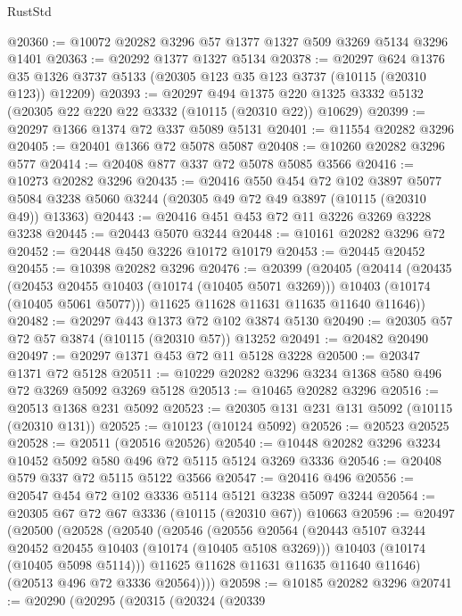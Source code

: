 \begin{lexlean}{RustStd}
\begin{coremodule}
@20360 := @10072 @20282 @3296 @57 @1377 @1327 @509 @3269 @5134 @3296 @1401
@20363 := @20292 @1377 @1327 @5134
@20378 := @20297
    @624
    @1376
    @35
    @1326
    @3737
    @5133
    (@20305 @123 @35 @123 @3737 (@10115 (@20310 @123)) @12209)
@20393 := @20297
    @494
    @1375
    @220
    @1325
    @3332
    @5132
    (@20305 @22 @220 @22 @3332 (@10115 (@20310 @22)) @10629)
@20399 := @20297 @1366 @1374 @72 @337 @5089 @5131
@20401 := @11554 @20282 @3296
@20405 := @20401 @1366 @72 @5078 @5087
@20408 := @10260 @20282 @3296 @577
@20414 := @20408 @877 @337 @72 @5078 @5085 @3566
@20416 := @10273 @20282 @3296
@20435 := @20416
    @550
    @454
    @72
    @102
    @3897
    @5077
    @5084
    @3238
    @5060
    @3244
    (@20305 @49 @72 @49 @3897 (@10115 (@20310 @49)) @13363)
@20443 := @20416 @451 @453 @72 @11 @3226 @3269 @3228 @3238
@20445 := @20443 @5070 @3244
@20448 := @10161 @20282 @3296 @72
@20452 := @20448 @450 @3226 @10172 @10179
@20453 := @20445 @20452
@20455 := @10398 @20282 @3296
@20476 := @20399
    (@20405
      (@20414
        (@20435
          (@20453 @20455 @10403 (@10174 (@10405 @5071 @3269)))
          @10403
          (@10174 (@10405 @5061 @5077)))
        @11625
        @11628
        @11631
        @11635
        @11640
        @11646))
@20482 := @20297 @443 @1373 @72 @102 @3874 @5130
@20490 := @20305 @57 @72 @57 @3874 (@10115 (@20310 @57)) @13252
@20491 := @20482 @20490
@20497 := @20297 @1371 @453 @72 @11 @5128 @3228
@20500 := @20347 @1371 @72 @5128
@20511 := @10229 @20282 @3296 @3234 @1368 @580 @496 @72 @3269 @5092 @3269 @5128
@20513 := @10465 @20282 @3296
@20516 := @20513 @1368 @231 @5092
@20523 := @20305 @131 @231 @131 @5092 (@10115 (@20310 @131))
@20525 := @10123 (@10124 @5092)
@20526 := @20523 @20525
@20528 := @20511 (@20516 @20526)
@20540 := @10448 @20282 @3296 @3234 @10452 @5092 @580 @496 @72 @5115 @5124 @3269 @3336
@20546 := @20408 @579 @337 @72 @5115 @5122 @3566
@20547 := @20416 @496
@20556 := @20547 @454 @72 @102 @3336 @5114 @5121 @3238 @5097 @3244
@20564 := @20305 @67 @72 @67 @3336 (@10115 (@20310 @67)) @10663
@20596 := @20497
    (@20500
      (@20528
        (@20540
          (@20546
            (@20556
              @20564
              (@20443 @5107 @3244 @20452 @20455 @10403 (@10174 (@10405 @5108 @3269)))
              @10403
              (@10174 (@10405 @5098 @5114)))
            @11625
            @11628
            @11631
            @11635
            @11640
            @11646)
          (@20513 @496 @72 @3336 @20564))))
@20598 := @10185 @20282 @3296
@20741 := @20290
    (@20295
      (@20315
        (@20324
          (@20339

\end{coremodule}
\end{lexlean}
